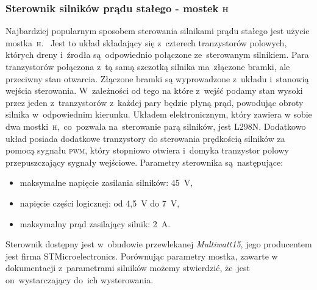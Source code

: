 \documentclass[11pt]{article}
\begin{document}
\subsubsection{Sterownik silników prądu stałego -  mostek \textsc{h}}
Najbardziej popularnym sposobem sterowania silnikami prądu stałego jest użycie mostka~\textsc{h}.
~Jest to układ składający się z~czterech tranzystorów polowych, których dreny i~źrodła są~odpowiednio połączone ze~sterowanym silnikiem. Para tranzystorów połączona z~tą samą szczotką silnika ma~złączone bramki, ale przeciwny stan otwarcia.
Złączone bramki są wyprowadzone z~układu i~stanowią wejścia sterowania. W~zależności od tego na które z~wejść podamy stan wysoki przez jeden z~tranzystorów z~każdej pary będzie płyną prąd, powodując obroty silnika w~odpowiednim kierunku.
Układem elektronicznym, który zawiera w sobie dwa mostki~\textsc{h},~co~pozwala na~sterowanie parą silników, jest L298N.
Dodatkowo układ posiada dodatkowe tranzystory do sterowania prędkością silników za pomocą sygnału \textsc{pwm}, który stopniowo otwiera i~domyka tranzystor polowy przepuszczający sygnały wejściowe. Parametry sterownika są~następujące:
\begin{itemize}
	\item maksymalne napięcie zasilania silników: 45~\si{\volt},
	\item napięcie części logicznej: od 4,5~\si{\volt} do 7~\si{\volt},
	\item maksymalny prąd zasilający silnik: 2~\si{\ampere}.
\end{itemize}
Sterownik dostępny jest w~obudowie przewlekanej \textit{Multiwatt15}, jego producentem jest firma STMicroelectronics. Porównując parametry mostka, zawarte w dokumentacji \cite{h_bridge_datasheet} z~parametrami silników możemy stwierdzić, że~jest on~wystarczający do~ich wysterowania.
\end{document}
